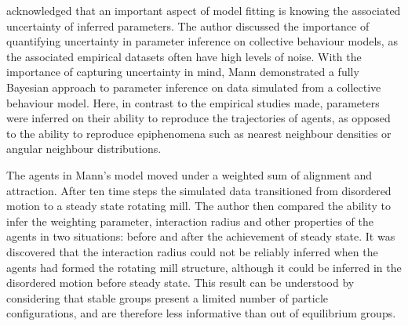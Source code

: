 \textcite{mann11} acknowledged that an important aspect of model fitting is
knowing the associated uncertainty of inferred parameters. The author discussed
the importance of quantifying uncertainty in parameter inference on collective
behaviour models, as the associated empirical datasets often have high levels
of noise. With the importance of capturing uncertainty in mind, Mann
demonstrated a fully Bayesian approach to parameter inference on data simulated
from a collective behaviour model. Here, in contrast to the empirical studies
made, parameters were inferred on their ability to reproduce the trajectories
of agents, as opposed to the ability to reproduce epiphenomena such as nearest
neighbour densities or angular neighbour distributions.

The agents in Mann's model moved under a weighted sum of alignment and
attraction. After ten time steps the simulated data transitioned from
disordered motion to a steady state rotating mill. The author then compared the
ability to infer the weighting parameter, interaction radius and other
properties of the agents in two situations: before and after the achievement of
steady state. It was discovered that the interaction radius could not be
reliably inferred when the agents had formed the rotating mill structure,
although it could be inferred in the disordered motion before steady state.
This result can be understood by considering that stable groups present a
limited number of particle configurations, and are therefore less informative
than out of equilibrium groups.

